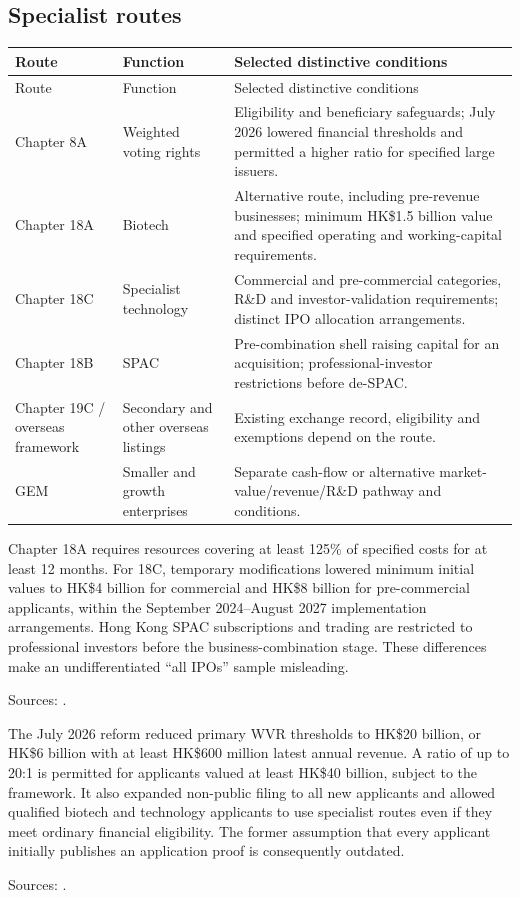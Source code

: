 \documentclass[11pt,a4paper]{article}
\newcommand{\source}[1]{\par{\footnotesize\color{ink}Sources: \cite{#1}.}\par}
\begin{document}
\subsection{Specialist routes}
\begin{longtable}{@{}L{3.0cm}L{5.7cm}L{6.8cm}@{}}
\toprule Route & Function & Selected distinctive conditions\\\midrule\endfirsthead
\toprule Route & Function & Selected distinctive conditions\\\midrule\endhead
Chapter 8A & Weighted voting rights & Eligibility and beneficiary safeguards; July 2026 lowered financial thresholds and permitted a higher ratio for specified large issuers.\\
Chapter 18A & Biotech & Alternative route, including pre-revenue businesses; minimum HK\$1.5 billion value and specified operating and working-capital requirements.\\
Chapter 18C & Specialist technology & Commercial and pre-commercial categories, R\&D and investor-validation requirements; distinct IPO allocation arrangements.\\
Chapter 18B & SPAC & Pre-combination shell raising capital for an acquisition; professional-investor restrictions before de-SPAC.\\
Chapter 19C / overseas framework & Secondary and other overseas listings & Existing exchange record, eligibility and exemptions depend on the route.\\
GEM & Smaller and growth enterprises & Separate cash-flow or alternative market-value/revenue/R\&D pathway and conditions.\\
\bottomrule
\end{longtable}
Chapter 18A requires resources covering at least 125\% of specified costs for at least 12 months. For 18C, temporary modifications lowered minimum initial values to HK\$4 billion for commercial and HK\$8 billion for pre-commercial applicants, within the September 2024--August 2027 implementation arrangements. Hong Kong SPAC subscriptions and trading are restricted to professional investors before the business-combination stage. These differences make an undifferentiated ``all IPOs'' sample misleading.\source{biotech,tech2024,spachk,gem}

The July 2026 reform reduced primary WVR thresholds to HK\$20 billion, or HK\$6 billion with at least HK\$600 million latest annual revenue. A ratio of up to 20:1 is permitted for applicants valued at least HK\$40 billion, subject to the framework. It also expanded non-public filing to all new applicants and allowed qualified biotech and technology applicants to use specialist routes even if they meet ordinary financial eligibility. The former assumption that every applicant initially publishes an application proof is consequently outdated.\source{compet2026}
\end{document}
